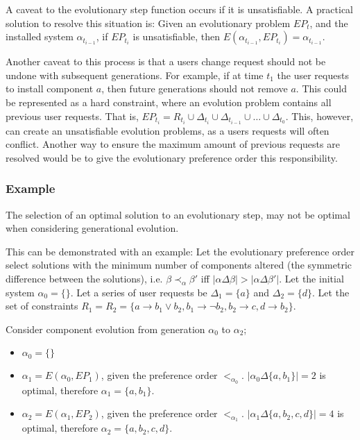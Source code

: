 A caveat to the evolutionary step function occurs if it is unsatisfiable.
A practical solution to resolve this situation is:
Given an evolutionary problem $EP_t$, and the installed system $\alpha_{t_{i-1}}$, if $EP_{t_i}$ is unsatisfiable, then $E(\alpha_{t_{i-1}},EP_{t_i}) = \alpha_{t_{i-1}}$.

Another caveat to this process is that a users change request should not be undone with subsequent generations.
For example, if at time $t_1$ the user requests to install component $a$, then future generations should not remove $a$.
This could be represented as a hard constraint, where an evolution problem contains all previous user requests.
That is, $EP_{t_i} = R_{t_i} \cup \Delta_{t_i} \cup \Delta_{t_{i-1}} \cup \ldots \cup \Delta_{t_{0}}$.
This, however, can create an unsatisfiable evolution problems, as a users requests will often conflict.
Another way to ensure the maximum amount of previous requests are resolved would be to give the evolutionary preference order this responsibility.

\subsubsection{Example}
The selection of an optimal solution to an evolutionary step, may not be optimal when considering generational evolution.

This can be demonstrated with an example:
Let the evolutionary preference order select solutions with the minimum number of components altered (the symmetric difference between the solutions), 
i.e. $\beta \prec_{\alpha} \beta'$ iff $|\alpha \Delta \beta| > |\alpha \Delta \beta'|$.
Let the initial system $\alpha_0 = \{\}$.
Let a series of user requests be $\Delta_1 = \{a\}$ and $ \Delta_2 = \{d\}$. 
Let the set of constraints $R_1 = R_2 = \{a \rightarrow b_1 \vee b_2, b_1 \rightarrow \neg b_2, b_2 \rightarrow c, d \rightarrow b_2\}$.

Consider component evolution from generation $\alpha_0$ to $\alpha_2$;
\begin{itemize}
  \item $\alpha_0 = \{\}$
  \item $\alpha_1 = E(\alpha_0,EP_1)$, given the preference order $<_{\alpha_0}$. $|\alpha_0 \Delta \{a,b_1\}| = 2$ is optimal, therefore $\alpha_1 = \{a,b_1\}$.
  \item $\alpha_2 = E(\alpha_1,EP_2)$, given the preference order $<_{\alpha_1}$. $|\alpha_1 \Delta \{a,b_2,c,d\}| = 4$ is optimal, therefore $\alpha_2 = \{a,b_2,c,d\}$.
\end{itemize}

